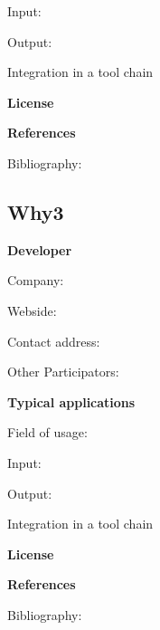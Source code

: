 
	Input:

	Output:





	Integration in a tool chain



	\textbf{License}


	\textbf{References}

	Bibliography:

\subsection{Why3}

	\textbf{Developer}

	Company: 

	Webside:

	Contact address:

	Other  Participators:



	\textbf{Typical applications}

	Field of usage:


	Input:

	Output:





	Integration in a tool chain



	\textbf{License}


	\textbf{References}

	Bibliography:

